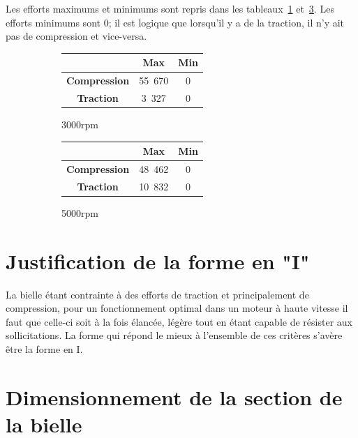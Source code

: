 \documentclass{article}
\begin{document}
Les efforts maximums et minimums sont repris dans les tableaux~\ref{fig:max_3000rpm} et~\ref{fig:max_5000rpm}. Les efforts minimums sont 0; il est logique que lorsqu'il y a de la traction, il n'y ait pas de compression et vice-versa.


\begin{figure}[h!]
\centering
    \begin{subfigure}[h]{0.45\textwidth}
    		\begin{tabular}{|c|c|c|}
    		\hline
    		&\textbf{Max}&\textbf{Min}\\
		\hline 
		\textbf{Compression} & \unit{55.670}{\kilo\newton} & 0\\ 
		\hline 
		\textbf{Traction} & \unit{3.327}{\kilo\newton} & 0\\ 
		\hline 
		\end{tabular} 
        \caption{\unit{3000}{rpm}}
        \label{fig:max_3000rpm}
    \end{subfigure}
    \begin{subfigure}[h]{0.45\textwidth}
        \begin{tabular}{|c|c|c|}
        \hline
    		&\textbf{Max}&\textbf{Min}\\
		\hline 
		\textbf{Compression} & \unit{48.462}{\kilo\newton}&0 \\ 
		\hline 
		\textbf{Traction} & \unit{10.832}{\kilo\newton} &0\\ 
		\hline 
		\end{tabular} 
        \caption{\unit{5000}{rpm}}
        \label{fig:max_5000rpm}
    \end{subfigure}
    \caption{}
\end{figure}



\section{Justification de la forme en "I"}
La bielle étant contrainte à des efforts de traction et principalement de compression, pour un fonctionnement optimal dans un moteur à haute vitesse il faut que celle-ci soit à la fois élancée, légère tout en étant capable de résister aux sollicitations. La forme qui répond le mieux à l'ensemble de ces critères s'avère être la forme en I.



\section{Dimensionnement de la section de la bielle}
\end{document}
